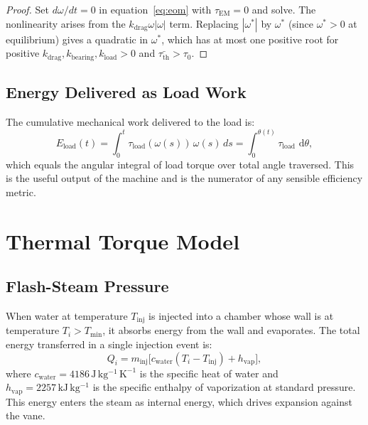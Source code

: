 \documentclass[11pt, a4paper]{article}
\theoremstyle{plain}
\theoremstyle{definition}
\newcommand{\dtheta}{\,\mathrm{d}\theta}
\newcommand{\Tinject}{T_{\mathrm{inj}}}
\newcommand{\tauEM}{\tau_{\mathrm{EM}}}
\newcommand{\tauth}{\tau_{\mathrm{th}}}
\newcommand{\tauload}{\tau_{\mathrm{load}}}
\newcommand{\Eload}{E_{\mathrm{load}}}
\newcommand{\om}{\omega}
\begin{document}
\begin{proof}
Set $d\om/dt = 0$ in equation~\eqref{eq:eom} with $\tauEM = 0$ and solve. The nonlinearity arises from the $k_{\mathrm{drag}}\om|\om|$ term. Replacing $|\om^*|$ by $\om^*$ (since $\om^* > 0$ at equilibrium) gives a quadratic in $\om^*$, which has at most one positive root for positive $k_{\mathrm{drag}}, k_{\mathrm{bearing}}, k_{\mathrm{load}} > 0$ and $\bar{\tauth} > \tau_0$.
\end{proof}

\subsection{Energy Delivered as Load Work}

The cumulative mechanical work delivered to the load is:
\begin{equation}
  \Eload(t) = \int_0^t \tauload(\om(s))\, \om(s)\, ds = \int_0^{\theta(t)} \tauload\, \dtheta,
\end{equation}
which equals the angular integral of load torque over total angle traversed. This is the useful output of the machine and is the numerator of any sensible efficiency metric.

\section{Thermal Torque Model}
\label{sec:torque}

\subsection{Flash-Steam Pressure}

When water at temperature $\Tinject$ is injected into a chamber whose wall is at temperature $T_i > T_{\mathrm{min}}$, it absorbs energy from the wall and evaporates. The total energy transferred in a single injection event is:
\begin{equation}
  Q_i = m_{\mathrm{inj}} \bigl[ c_{\mathrm{water}}(T_i - \Tinject) + h_{\mathrm{vap}} \bigr],
  \label{eq:Qinj}
\end{equation}
where $c_{\mathrm{water}} = 4186\,\mathrm{J\,kg^{-1}\,K^{-1}}$ is the specific heat of water and $h_{\mathrm{vap}} = 2257\,\mathrm{kJ\,kg^{-1}}$ is the specific enthalpy of vaporization at standard pressure. This energy enters the steam as internal energy, which drives expansion against the vane.
\end{document}
